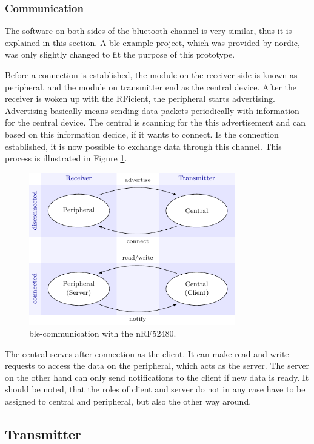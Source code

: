 \subsubsection{Communication}
The software on both sides of the bluetooth channel is very similar, thus it is explained in this section.
A \acs{ble} example project, which was provided by nordic, was only slightly changed to fit the purpose of this prototype.

Before a connection is established, the module on the receiver side is known as peripheral, and the module on transmitter end as the central device.
After the receiver is woken up with the RFicient, the peripheral starts advertising.
Advertising basically means sending data packets periodically with information for the central device.
The central is scanning for the this advertisement and can based on this information decide, if it wants to connect.
Is the connection established, it is now possible to exchange data through this channel.
This process is illustrated in Figure \ref{software:ble}.
\begin{figure}[ht]
	\centering
	\includegraphics[width=0.8\textwidth]{4-development/software/graphics/ble.pdf}
	\caption{\acs{ble}-communication with the nRF52480.\label{software:ble}}
\end{figure}

The central serves after connection as the client.
It can make read and write requests to access the data on the peripheral, which acts as the server.
The server on the other hand can only send notifications to the client if new data is ready.
It should be noted, that the roles of client and server do not in any case have to be assigned to central and peripheral, but also the other way around. 

\subsection{Transmitter}

